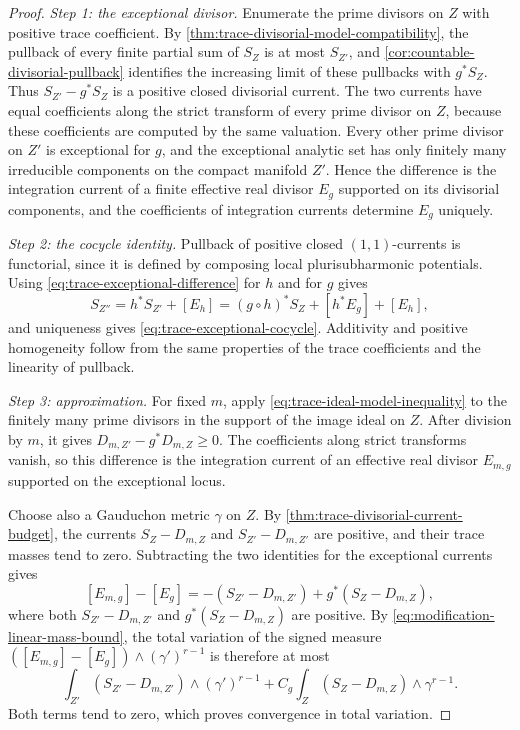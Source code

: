\begin{proof}
\emph{Step 1: the exceptional divisor.} Enumerate the prime divisors on $Z$ with positive trace coefficient. By \cref{thm:trace-divisorial-model-compatibility}, the pullback of every finite partial sum of $S_Z$ is at most $S_{Z'}$, and \cref{cor:countable-divisorial-pullback} identifies the increasing limit of these pullbacks with $g^*S_Z$. Thus $S_{Z'}-g^*S_Z$ is a positive closed divisorial current. The two currents have equal coefficients along the strict transform of every prime divisor on $Z$, because these coefficients are computed by the same valuation. Every other prime divisor on $Z'$ is exceptional for $g$, and the exceptional analytic set has only finitely many irreducible components on the compact manifold $Z'$. Hence the difference is the integration current of a finite effective real divisor $E_g$ supported on its divisorial components, and the coefficients of integration currents determine $E_g$ uniquely.

\emph{Step 2: the cocycle identity.} Pullback of positive closed $(1,1)$-currents is functorial, since it is defined by composing local plurisubharmonic potentials. Using \eqref{eq:trace-exceptional-difference} for $h$ and for $g$ gives
\[
 S_{Z''}=h^*S_{Z'}+[E_h]
        =(g\circ h)^*S_Z+[h^*E_g]+[E_h],
\]
and uniqueness gives \eqref{eq:trace-exceptional-cocycle}. Additivity and positive homogeneity follow from the same properties of the trace coefficients and the linearity of pullback.

\emph{Step 3: approximation.} For fixed $m$, apply \eqref{eq:trace-ideal-model-inequality} to the finitely many prime divisors in the support of the image ideal on $Z$. After division by $m$, it gives $D_{m,Z'}-g^*D_{m,Z}\geq0$. The coefficients along strict transforms vanish, so this difference is the integration current of an effective real divisor $E_{m,g}$ supported on the exceptional locus.

Choose also a Gauduchon metric $\gamma$ on $Z$. By \cref{thm:trace-divisorial-current-budget}, the currents $S_Z-D_{m,Z}$ and $S_{Z'}-D_{m,Z'}$ are positive, and their trace masses tend to zero. Subtracting the two identities for the exceptional currents gives
\[
 [E_{m,g}]-[E_g]
   =-(S_{Z'}-D_{m,Z'})+g^*(S_Z-D_{m,Z}),
\]
where both $S_{Z'}-D_{m,Z'}$ and $g^*(S_Z-D_{m,Z})$ are positive. By \eqref{eq:modification-linear-mass-bound}, the total variation of the signed measure $([E_{m,g}]-[E_g])\wedge(\gamma')^{r-1}$ is therefore at most
\[
 \int_{Z'}(S_{Z'}-D_{m,Z'})\wedge(\gamma')^{r-1}
 +C_g\int_Z(S_Z-D_{m,Z})\wedge\gamma^{r-1}.
\]
Both terms tend to zero, which proves convergence in total variation.
\end{proof}

